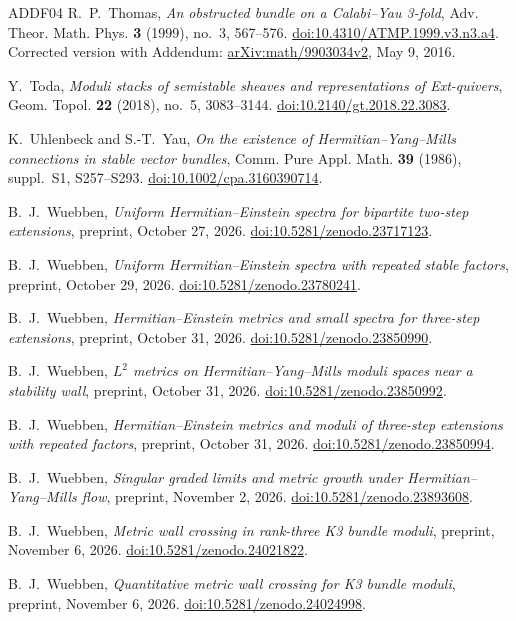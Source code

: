 \begin{thebibliography}{ADDF04}
R.~P.~Thomas, \emph{An obstructed bundle on a Calabi--Yau 3-fold},
Adv. Theor. Math. Phys. \textbf{3} (1999), no.~3, 567--576.
\href{https://doi.org/10.4310/ATMP.1999.v3.n3.a4}{doi:10.4310/ATMP.1999.v3.n3.a4}.
Corrected version with Addendum:
\href{https://arxiv.org/abs/math/9903034v2}{arXiv:math/9903034v2}, May 9, 2016.

Y.~Toda,
\emph{Moduli stacks of semistable sheaves and representations of Ext-quivers},
Geom. Topol. \textbf{22} (2018), no.~5, 3083--3144.
\href{https://doi.org/10.2140/gt.2018.22.3083}{doi:10.2140/gt.2018.22.3083}.

K.~Uhlenbeck and S.-T.~Yau,
\emph{On the existence of Hermitian--Yang--Mills connections in stable vector bundles},
Comm. Pure Appl. Math. \textbf{39} (1986), suppl.~S1, S257--S293.
\href{https://doi.org/10.1002/cpa.3160390714}{doi:10.1002/cpa.3160390714}.

B.~J.~Wuebben,
\emph{Uniform Hermitian--Einstein spectra for bipartite two-step extensions},
preprint, October 27, 2026.
\href{https://doi.org/10.5281/zenodo.23717123}{doi:10.5281/zenodo.23717123}.

B.~J.~Wuebben,
\emph{Uniform Hermitian--Einstein spectra with repeated stable factors},
preprint, October 29, 2026.
\href{https://doi.org/10.5281/zenodo.23780241}{doi:10.5281/zenodo.23780241}.

B.~J.~Wuebben,
\emph{Hermitian--Einstein metrics and small spectra for three-step extensions},
preprint, October 31, 2026.
\href{https://doi.org/10.5281/zenodo.23850990}{doi:10.5281/zenodo.23850990}.

B.~J.~Wuebben,
\emph{$L^2$ metrics on Hermitian--Yang--Mills moduli spaces near a stability wall},
preprint, October 31, 2026.
\href{https://doi.org/10.5281/zenodo.23850992}{doi:10.5281/zenodo.23850992}.

B.~J.~Wuebben,
\emph{Hermitian--Einstein metrics and moduli of three-step extensions with repeated factors},
preprint, October 31, 2026.
\href{https://doi.org/10.5281/zenodo.23850994}{doi:10.5281/zenodo.23850994}.

B.~J.~Wuebben,
\emph{Singular graded limits and metric growth under Hermitian--Yang--Mills flow},
preprint, November 2, 2026.
\href{https://doi.org/10.5281/zenodo.23893608}{doi:10.5281/zenodo.23893608}.

B.~J.~Wuebben,
\emph{Metric wall crossing in rank-three K3 bundle moduli},
preprint, November 6, 2026.
\href{https://doi.org/10.5281/zenodo.24021822}{doi:10.5281/zenodo.24021822}.

B.~J.~Wuebben,
\emph{Quantitative metric wall crossing for K3 bundle moduli},
preprint, November 6, 2026.
\href{https://doi.org/10.5281/zenodo.24024998}{doi:10.5281/zenodo.24024998}.

\end{thebibliography}
